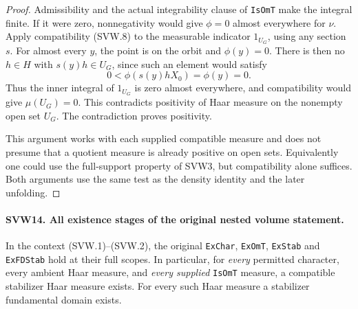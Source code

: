 \begin{proof}
Admissibility and the actual integrability clause of
\texttt{IsOmT} make the integral finite.  If it were zero,
nonnegativity would give $\phi=0$ almost everywhere for $\nu$.
Apply compatibility (SVW.8) to the measurable indicator $1_{U_G}$,
using any section $s$.  For almost every $y$, the point is on
the orbit and $\phi(y)=0$.  There is then no $h\in H$ with
$s(y)h\in U_G$, since such an element would satisfy
\[
                 0<\phi(s(y)hX_0)=\phi(y)=0.
\]
Thus the inner integral of $1_{U_G}$ is zero almost everywhere,
and compatibility would give $\mu(U_G)=0$.  This contradicts
positivity of Haar measure on the nonempty open set $U_G$.
The contradiction proves positivity.

This argument works with each supplied compatible measure and
does not presume that a quotient measure is already positive on
open sets.  Equivalently one could use the full-support property
of SVW3, but compatibility alone suffices.  Both arguments use
the same test as the density identity and the later unfolding.
\end{proof}

\paragraph{SVW14. All existence stages of the original nested volume statement.}
\label{claim:SVW14}
In the context (SVW.1)--(SVW.2), the original \texttt{ExChar},
\texttt{ExOmT}, \texttt{ExStab} and \texttt{ExFDStab} hold at their
full scopes.  In particular, for \emph{every} permitted character,
every ambient Haar measure, and \emph{every supplied}
\texttt{IsOmT} measure, a compatible stabilizer Haar measure exists.
For every such Haar measure a stabilizer fundamental domain exists.

